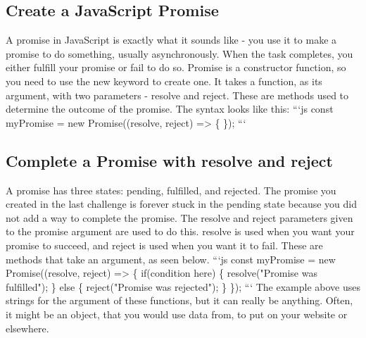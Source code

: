 \documentclass{article}%
\begin{document}
%
\subsection{Create a JavaScript Promise}%
\label{subsec:CreateaJavaScriptPromise}%
A promise in JavaScript is exactly what it sounds like {-} you use it to make a promise to do something, usually asynchronously. When the task completes, you either fulfill your promise or fail to do so. Promise is a constructor function, so you need to use the new keyword to create one. It takes a function, as its argument, with two parameters {-} resolve and reject. These are methods used to determine the outcome of the promise. The syntax looks like this:\newline%
```js\newline%
const myPromise = new Promise((resolve, reject) => \{\newline%
\});\newline%
```\newline%

%
\subsection{Complete a Promise with resolve and reject}%
\label{subsec:CompleteaPromisewithresolveandreject}%
A promise has three states: pending, fulfilled, and rejected. The promise you created in the last challenge is forever stuck in the pending state because you did not add a way to complete the promise. The resolve and reject parameters given to the promise argument are used to do this. resolve is used when you want your promise to succeed, and reject is used when you want it to fail. These are methods that take an argument, as seen below.\newline%
```js\newline%
const myPromise = new Promise((resolve, reject) => \{\newline%
  if(condition here) \{\newline%
    resolve("Promise was fulfilled");\newline%
  \} else \{\newline%
    reject("Promise was rejected");\newline%
  \}\newline%
\});\newline%
```\newline%
The example above uses strings for the argument of these functions, but it can really be anything. Often, it might be an object, that you would use data from, to put on your website or elsewhere.\newline%
\end{document}
